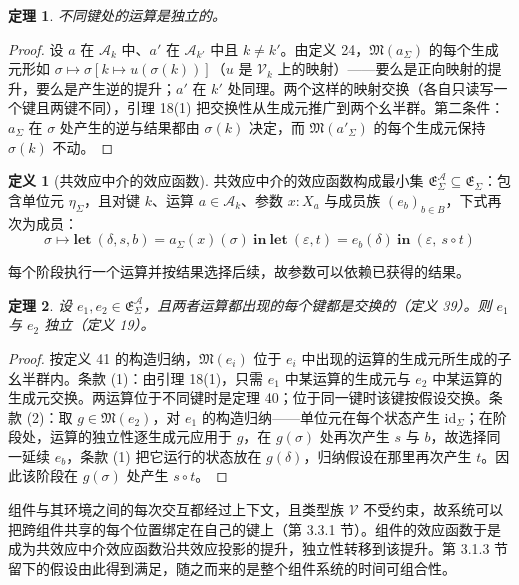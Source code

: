 \documentclass[11pt,a4paper]{article}
\theoremstyle{plain}
\newtheorem{theorem}{定理}
\theoremstyle{definition}
\newtheorem{definition}{定义}
\theoremstyle{remark}
\begin{document}
\begin{theorem}\label{thm:distinct-keys}
不同键处的运算是独立的。
\end{theorem}

\begin{proof}
设 $a$ 在 $\mathcal{A}_k$ 中、$a'$ 在 $\mathcal{A}_{k'}$ 中且 $k \neq k'$。由定义 24，$\mathfrak{M}(a_\Sigma)$ 的每个生成元形如 $\sigma \mapsto \sigma[k \mapsto u(\sigma(k))]$（$u$ 是 $\mathcal{V}_k$ 上的映射）——要么是正向映射的提升，要么是产生逆的提升；$a'$ 在 $k'$ 处同理。两个这样的映射交换（各自只读写一个键且两键不同），引理 18(1) 把交换性从生成元推广到两个幺半群。第二条件：$a_\Sigma$ 在 $\sigma$ 处产生的逆与结果都由 $\sigma(k)$ 决定，而 $\mathfrak{M}(a'_\Sigma)$ 的每个生成元保持 $\sigma(k)$ 不动。
\end{proof}

\begin{definition}[共效应中介的效应函数]
共效应中介的效应函数构成最小集 $\mathfrak{E}_\Sigma^{\mathcal{A}} \subseteq \mathfrak{E}_\Sigma$：包含单位元 $\eta_\Sigma$，且对键 $k$、运算 $a \in \mathcal{A}_k$、参数 $x : X_a$ 与成员族 $(e_b)_{b \in B}$，下式再次为成员：
\[
\sigma \mapsto \mathbf{let}\ (\delta, s, b) = a_\Sigma(x)(\sigma)\ \mathbf{in}\ \mathbf{let}\ (\varepsilon, t) = e_b(\delta)\ \mathbf{in}\ (\varepsilon,\ s \circ t) \tag{36}
\]
\end{definition}

每个阶段执行一个运算并按结果选择后续，故参数可以依赖已获得的结果。

\begin{theorem}\label{thm:coeffect-mediated}
设 $e_1, e_2 \in \mathfrak{E}_\Sigma^{\mathcal{A}}$，且两者运算都出现的每个键都是交换的（定义 39）。则 $e_1$ 与 $e_2$ 独立（定义 19）。
\end{theorem}

\begin{proof}
按定义 41 的构造归纳，$\mathfrak{M}(e_i)$ 位于 $e_i$ 中出现的运算的生成元所生成的子幺半群内。条款 (1)：由引理 18(1)，只需 $e_1$ 中某运算的生成元与 $e_2$ 中某运算的生成元交换。两运算位于不同键时是定理 40；位于同一键时该键按假设交换。条款 (2)：取 $g \in \mathfrak{M}(e_2)$，对 $e_1$ 的构造归纳——单位元在每个状态产生 $\mathrm{id}_\Sigma$；在阶段处，运算的独立性逐生成元应用于 $g$，在 $g(\sigma)$ 处再次产生 $s$ 与 $b$，故选择同一延续 $e_b$，条款 (1) 把它运行的状态放在 $g(\delta)$，归纳假设在那里再次产生 $t$。因此该阶段在 $g(\sigma)$ 处产生 $s \circ t$。
\end{proof}

组件与其环境之间的每次交互都经过上下文，且类型族 $\mathcal{V}$ 不受约束，故系统可以把跨组件共享的每个位置绑定在自己的键上（第 3.3.1 节）。组件的效应函数于是成为共效应中介效应函数沿共效应投影的提升，独立性转移到该提升。第 3.1.3 节留下的假设由此得到满足，随之而来的是整个组件系统的时间可组合性。
\end{document}
